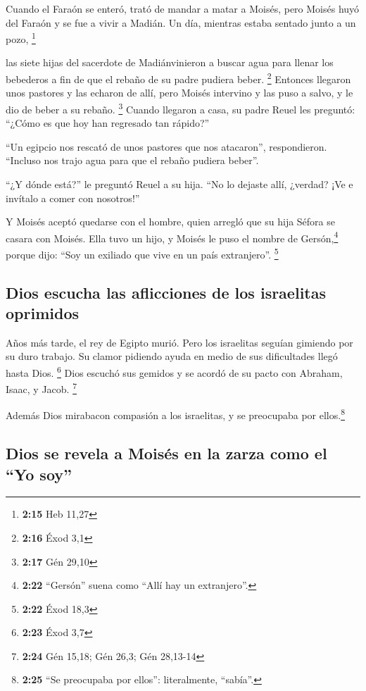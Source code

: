  Cuando el Faraón se enteró, trató de mandar a matar a
Moisés, pero Moisés huyó del Faraón y se fue a vivir a Madián. Un día,
mientras estaba sentado junto a un pozo, \footnote{\textbf{2:15} Heb
  11,27}

 las siete hijas del sacerdote de Madiánvinieron a buscar
agua para llenar los bebederos a fin de que el rebaño de su padre
pudiera beber. \footnote{\textbf{2:16} Éxod 3,1} 
Entonces llegaron unos pastores y las echaron de allí, pero Moisés
intervino y las puso a salvo, y le dio de beber a su rebaño. \footnote{\textbf{2:17}
  Gén 29,10}  Cuando llegaron a casa, su padre Reuel les
preguntó: ``¿Cómo es que hoy han regresado tan rápido?''

 ``Un egipcio nos rescató de unos pastores que nos
atacaron'', respondieron. ``Incluso nos trajo agua para que el rebaño
pudiera beber''.

 ``¿Y dónde está?'' le preguntó Reuel a su hija. ``No lo
dejaste allí, ¿verdad? ¡Ve e invítalo a comer con nosotros!''

 Y Moisés aceptó quedarse con el hombre, quien arregló
que su hija Séfora se casara con Moisés.  Ella tuvo un
hijo, y Moisés le puso el nombre de Gersón,\footnote{\textbf{2:22}
  ``Gersón'' suena como ``Allí hay un extranjero''.} porque dijo: ``Soy
un exiliado que vive en un país extranjero''. \footnote{\textbf{2:22}
  Éxod 18,3}

\hypertarget{dios-escucha-las-aflicciones-de-los-israelitas-oprimidos}{%
\subsection{Dios escucha las aflicciones de los israelitas
oprimidos}\label{dios-escucha-las-aflicciones-de-los-israelitas-oprimidos}}

 Años más tarde, el rey de Egipto murió. Pero los
israelitas seguían gimiendo por su duro trabajo. Su clamor pidiendo
ayuda en medio de sus dificultades llegó hasta Dios. \footnote{\textbf{2:23}
  Éxod 3,7}  Dios escuchó sus gemidos y se acordó de su
pacto con Abraham, Isaac, y Jacob. \footnote{\textbf{2:24} Gén 15,18;
  Gén 26,3; Gén 28,13-14}

 Además Dios mirabacon compasión a los israelitas, y se
preocupaba por ellos.\footnote{\textbf{2:25} ``Se preocupaba por
  ellos'': literalmente, ``sabía''.}

\hypertarget{dios-se-revela-a-moisuxe9s-en-la-zarza-como-el-yo-soy}{%
\subsection{Dios se revela a Moisés en la zarza como el ``Yo
soy''}\label{dios-se-revela-a-moisuxe9s-en-la-zarza-como-el-yo-soy}}

